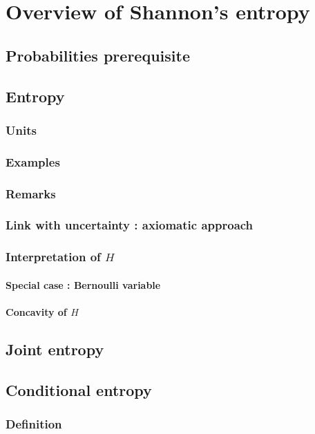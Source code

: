 \documentclass[a4paper, 12pt]{book}
\begin{document}
\chapter{Overview of Shannon's entropy}
\section{Probabilities prerequisite}


\section{Entropy}
\subsection{Units}
\subsection{Examples}
\subsection{Remarks}
\subsection{Link with uncertainty : axiomatic approach}
\subsection{Interpretation of $H$}
\subsubsection{Special case : Bernoulli variable}
\subsubsection{Concavity of $H$}

\section{Joint entropy}

\section{Conditional entropy}
\subsection{Definition}
\end{document}
